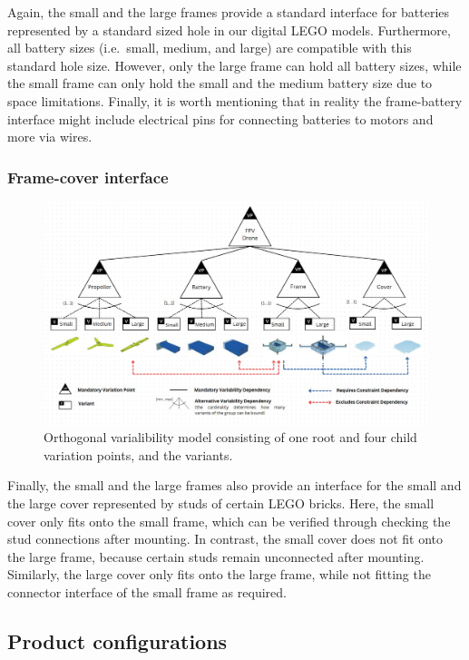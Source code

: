 \documentclass[sigconf,review]{acmart}
\begin{document}
Again, the small and the large frames provide a standard interface for batteries represented by a standard sized hole in our digital LEGO models.
Furthermore, all battery sizes (i.e.\ small, medium, and large) are compatible with this standard hole size.
However, only the large frame can hold all battery sizes, while the small frame can only hold the small and the medium battery size due to space limitations.
Finally, it is worth mentioning that in reality the frame-battery interface might include electrical pins for connecting batteries to motors and more via wires.

\subsubsection*{Frame-cover interface}

\begin{figure}[tbp]
    \includegraphics[width=\textwidth]{./FeatureTreeWithLegend3.jpg}
    \caption{Orthogonal varialibility model consisting of one root and four child variation points, and the variants.}
    \label{fig:feature-tree}
\end{figure}

Finally, the small and the large frames also provide an interface for the small and the large cover represented by studs of certain LEGO bricks.
Here, the small cover only fits onto the small frame, which can be verified through checking the stud connections after mounting.
In contrast, the small cover does not fit onto the large frame, because certain studs remain unconnected after mounting.
Similarly, the large cover only fits onto the large frame, while not fitting the connector interface of the small frame as required.

\subsection{Product configurations}
\label{sec:configuration-options}
\end{document}

